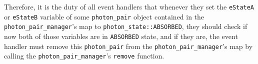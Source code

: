 Therefore, it is the duty of all event handlers that whenever they set the \texttt{eStateA} or \texttt{eStateB} variable of some \texttt{photon\_pair} object contained in the \texttt{photon\_pair\_manager}'s map to \texttt{photon\_state::ABSORBED}, they should check if now both of those variables are in \texttt{ABSORBED} state, and if they are, the event handler must remove this \texttt{photon\_pair} from the \texttt{photon\_pair\_manager}'s map by calling the \texttt{photon\_pair\_manager}'s \texttt{remove} function.




